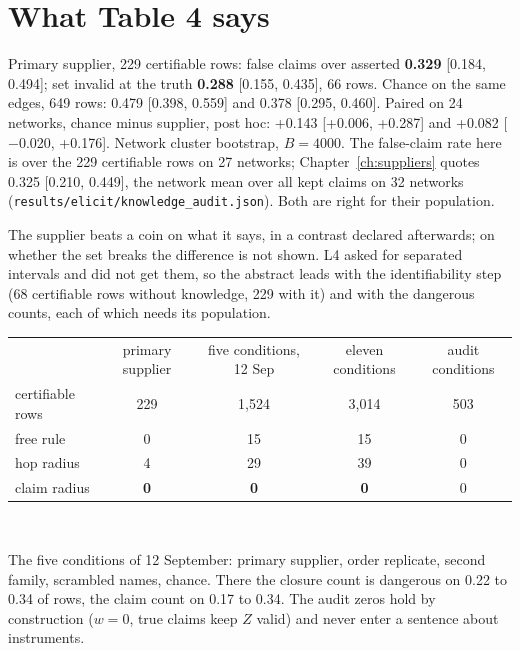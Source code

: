 \begin{antes}
\end{antes}

\section{What Table 4 says}

\begin{medido}
Primary supplier, 229 certifiable rows: false claims over asserted \textbf{0.329} [0.184, 0.494]; set
invalid at the truth \textbf{0.288} [0.155, 0.435], 66 rows. Chance on the same edges, 649 rows: 0.479
[0.398, 0.559] and 0.378 [0.295, 0.460]. Paired on 24 networks, chance minus supplier, post hoc: +0.143
[+0.006, +0.287] and +0.082 [$-$0.020, +0.176]. Network cluster bootstrap, $B = 4000$. The false-claim
rate here is over the 229 certifiable rows on 27 networks; Chapter~\ref{ch:suppliers} quotes 0.325
[0.210, 0.449], the network mean over all kept claims on 32 networks (\texttt{results/elicit/knowledge\_audit.json}).
Both are right for their population.
\end{medido}

The supplier beats a coin on what it says, in a contrast declared afterwards; on whether the set breaks
the difference is not shown. L4 asked for separated intervals and did not get them, so the abstract
leads
with the identifiability step (68 certifiable rows without knowledge, 229 with it) and with the
dangerous
counts, each of which needs its population.

\begin{medido}
\centering\small
\begin{tabular}{@{}lcccc@{}}
\toprule
& primary supplier & five conditions, 12 Sep & eleven conditions & audit conditions \\
certifiable rows & 229 & 1,524 & 3,014 & 503 \\
\midrule
free rule & 0 & 15 & 15 & 0 \\
hop radius & 4 & 29 & 39 & 0 \\
claim radius & \textbf{0} & \textbf{0} & \textbf{0} & 0 \\
\bottomrule
\end{tabular}\\[0.3em]
\raggedright
The five conditions of 12 September: primary supplier, order replicate, second family, scrambled names,
chance. There the closure count is dangerous on 0.22 to 0.34 of rows, the claim count on 0.17 to 0.34.
The audit zeros hold by construction ($w = 0$, true claims keep $Z$ valid) and never enter a sentence
about instruments.
\end{medido}

